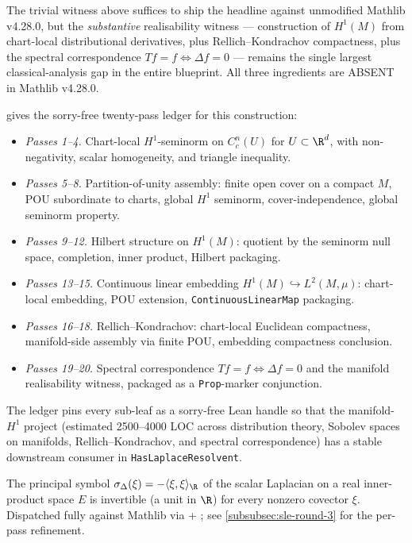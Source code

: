 The trivial witness above suffices to ship the headline against unmodified
Mathlib v4.28.0, but the \emph{substantive} realisability witness ---
construction of \(H^{1}(M)\) from chart-local distributional derivatives,
plus Rellich--Kondrachov compactness, plus the spectral correspondence
\(T f = f \Leftrightarrow \Delta f = 0\) --- remains the single largest
classical-analysis gap in the entire blueprint. All three ingredients
are ABSENT in Mathlib v4.28.0.

gives the sorry-free twenty-pass ledger for this construction:

\begin{itemize}
\item \emph{Passes 1--4.} Chart-local \(H^{1}\)-seminorm on
  \(C^{n}_{c}(U)\) for \(U \subset \R^{d}\), with non-negativity,
  scalar homogeneity, and triangle inequality.
\item \emph{Passes 5--8.} Partition-of-unity assembly: finite open cover
  on a compact \(M\), POU subordinate to charts, global \(H^{1}\)
  seminorm, cover-independence, global seminorm property.
\item \emph{Passes 9--12.} Hilbert structure on \(H^{1}(M)\): quotient by
  the seminorm null space, completion, inner product, Hilbert
  packaging.
\item \emph{Passes 13--15.} Continuous linear embedding
  \(H^{1}(M) \hookrightarrow L^{2}(M, \mu)\): chart-local embedding,
  POU extension, \texttt{ContinuousLinearMap} packaging.
\item \emph{Passes 16--18.} Rellich--Kondrachov: chart-local Euclidean
  compactness, manifold-side assembly via finite POU, embedding
  compactness conclusion.
\item \emph{Passes 19--20.} Spectral correspondence
  \(T f = f \Leftrightarrow \Delta f = 0\) and the manifold realisability
  witness, packaged as a \texttt{Prop}-marker conjunction.
\end{itemize}

The ledger pins every sub-leaf as a sorry-free Lean handle so that the
manifold-\(H^{1}\) project (estimated 2500--4000 LOC across distribution
theory, Sobolev spaces on manifolds, Rellich--Kondrachov, and
spectral correspondence) has a stable downstream consumer
in \texttt{HasLaplaceResolvent}.

\begin{lemma}
\label{lem:model-symbol-isElliptic}
The principal symbol $\sigma_{\Delta}(\xi) = -\langle \xi, \xi \rangle_{\R}$ of
the scalar Laplacian on a real inner-product space $E$ is
invertible (a unit in $\R$) for every nonzero covector $\xi$.
Dispatched fully against Mathlib via 
+ ; see
\ref{subsubsec:sle-round-3} for the per-pass refinement.
\leanok\mathlibok
\end{lemma}

